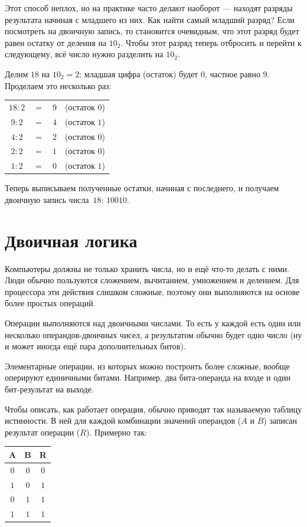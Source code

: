 Этот способ неплох, но на практике часто делают наоборот --- находят разряды результата начиная
с младшего из них. Как найти самый младший разряд? Если посмотреть на двоичную запись,
то становится очевидным, что этот разряд будет равен остатку от деления на $10_2$.
Чтобы этот разряд теперь отбросить и перейти к следующему, всё число нужно разделить на $10_2$.

Делим $18$ на $10_2=2$: младшая цифра (остаток) будет $0$, частное равно $9$.
Проделаем это несколько раз:
\begin{center}
\begin{tabular}{cccc}
$18 : 2$ & $=$ & $9$ & (остаток $0$) \\
$9 : 2$ & $=$ & $4$ & (остаток $1$) \\
$4 : 2$ & $=$ & $2$ & (остаток $0$) \\
$2 : 2$ & $=$ & $1$ & (остаток $0$) \\
$1 : 2$ & $=$ & $0$ & (остаток $1$) \\
\end{tabular}
\end{center}

Теперь выписываем полученные остатки, начиная с последнего, и получаем двоичную
запись числа~$18$: $10010$.

\section{Двоичная логика}

Компьютеры должны не только хранить числа, но и ещё что-то делать с ними.
Люди обычно пользуются сложением, вычитанием, умножением и делением.
Для процессора эти действия слишком сложные, поэтому они выполняются
на основе более простых операций.

Операции выполняются над двоичными числами. То есть у каждой
есть один или несколько операндов-двоичных чисел, а результатом обычно будет одно число
(ну и может иногда ещё пара дополнительных битов).

Элементарные операции, из которых можно построить более сложные,
вообще оперируют единичными битами. Например, два бита-операнда
на входе и один бит-результат на выходе.

Чтобы описать, как работает операция, обычно приводят
так называемую таблицу истинности. В ней для каждой комбинации значений
операндов ($A$ и $B$) записан результат операции ($R$). Примерно так:

\begin{center}
\begin{tabular}{|c|c|c|}
 \hline
 \textbf{A} & \textbf{B} & \textbf{R} \\ \hline
 $0$ & $0$ & $0$ \\ \hline
 $1$ & $0$ & $1$ \\ \hline
 $0$ & $1$ & $1$ \\ \hline
 $1$ & $1$ & $1$ \\ \hline
\end{tabular}
\end{center}

